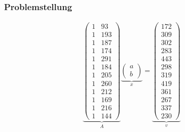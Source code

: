 \documentclass{beamer}
\begin{document}
\begin{frame}
    \frametitle{Problemstellung}
    \small
    \begin{align*}
        \underbrace{
        \begin{pmatrix}
            1 &  93 \\
            1 & 193 \\
            1 & 187 \\
            1 & 174 \\
            1 & 291 \\
            1 & 184 \\
            1 & 205 \\
            1 & 260 \\
            1 & 212 \\
            1 & 169 \\
            1 & 216 \\
            1 & 144
        \end{pmatrix}
        }_A
        \underbrace{
        \begin{pmatrix}
            a \\ b
        \end{pmatrix}
        }_x
        =
        \underbrace{
        \begin{pmatrix}        
            172 \\
            309 \\
            302 \\
            283 \\
            443 \\
            298 \\
            319 \\
            419 \\
            361 \\
            267 \\
            337 \\
            230
        \end{pmatrix}
        }_v
    \end{align*}
\end{frame}
\end{document}
